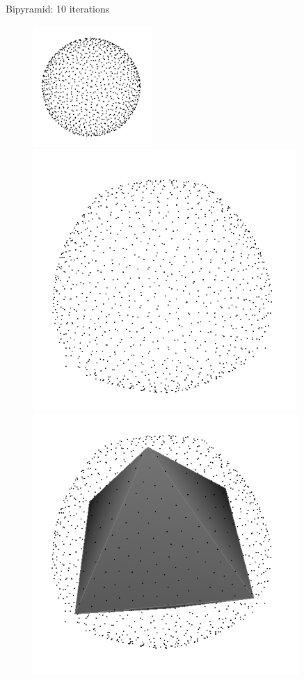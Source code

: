 \documentclass{beamer}
\begin{document}
\begin{frame}
    Bipyramid: 10 iterations
    \begin{figure}
        \centering
        \includegraphics[scale=0.4]{img/sphere-cube-0}
        \includegraphics[scale=0.2]{img/sphere-bipyramid-10}
        \includegraphics[scale=0.2]{img/sphere-bipyramid-bipyramid}
    \end{figure}
\end{frame}
\end{document}
